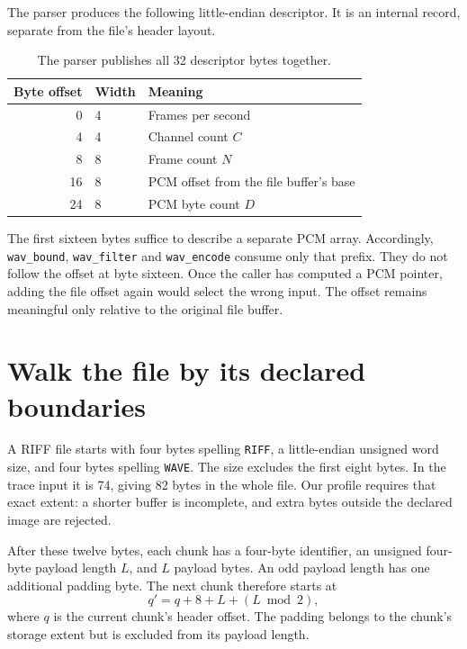 The parser produces the following little-endian descriptor. It is an internal
record, separate from the file's header layout.
\begin{table}[!ht]
  \centering
  \begin{tabular}{rll}
    \toprule
    Byte offset & Width & Meaning                                \\
    \midrule
    0           & 4     & Frames per second                      \\
    4           & 4     & Channel count $C$                      \\
    8           & 8     & Frame count $N$                        \\
    16          & 8     & PCM offset from the file buffer's base \\
    24          & 8     & PCM byte count $D$                     \\
    \bottomrule
  \end{tabular}
  \caption{The parser publishes all 32 descriptor bytes together.}
  \label{revision:wav-descriptor-layout}
\end{table}

The first sixteen bytes suffice to describe a separate PCM array. Accordingly,
\texttt{wav\_bound}, \texttt{wav\_filter} and \texttt{wav\_encode} consume only
that prefix. They do not follow the offset at byte sixteen. Once the caller has
computed a PCM pointer, adding the file offset again would select the wrong
input. The offset remains meaningful only relative to the original file buffer.

\section{Walk the file by its declared boundaries}

A RIFF file starts with four bytes spelling \texttt{RIFF}, a little-endian
unsigned word size, and four bytes spelling \texttt{WAVE}. The size excludes
the first eight bytes. In the trace input it is 74, giving 82 bytes in the whole
file. Our profile requires that exact extent: a shorter buffer is incomplete,
and extra bytes outside the declared image are rejected.

After these twelve bytes, each chunk has a four-byte identifier, an unsigned
four-byte payload length $L$, and $L$ payload bytes. An odd payload length has
one additional padding byte. The next chunk therefore starts at
\[
  q'=q+8+L+(L\bmod2),
\]
where $q$ is the current chunk's header offset. The padding belongs to the
chunk's storage extent but is excluded from its payload length.

